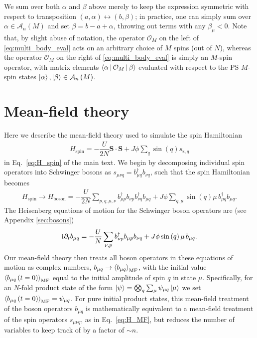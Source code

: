\documentclass[nofootinbib,twocolumn]{revtex4-2}
\renewcommand{\t}{\text} %
\newcommand{\f}[2]{\dfrac{#1}{#2}} %
\newcommand{\p}[1]{\left(#1\right)} %
\newcommand{\bk}{\Braket} %
\renewcommand{\v}{\bm} %
\renewcommand{\c}{\cdot} %
\renewcommand{\d}{\partial} %
\renewcommand{\i}{\mathrm{i}\mkern1mu} %
\newcommand{\1}{\mathds{1}}
\newcommand{\z}{\text{z}}
\newcommand{\A}{\mathcal{A}}
\renewcommand{\O}{\mathcal{O}}
\newcommand{\MF}{\text{MF}}
\begin{document}
We sum over both $\alpha$ and $\beta$ above merely to keep the expression symmetric with respect to transposition $\p{a,\alpha}\leftrightarrow\p{b,\beta}$; in practice, one can simply sum over $\alpha\in\A_n\p{M}$ and set $\beta=b-a+\alpha$, throwing out terms with any $\beta_\mu<0$.
Note that, by slight abuse of notation, the operator $\O_M$ on the left of \eqref{eq:multi_body_eval} acts on an arbitrary choice of $M$ spins (out of $N$), whereas the operator $\O_M$ on the right of \eqref{eq:multi_body_eval} is simply an $M$-spin operator, with matrix elements $\bk{\alpha|\O_M|\beta}$ evaluated with respect to the PS $M$-spin states $\ket\alpha,\ket\beta\in\A_n\p{M}$.

\section{Mean-field theory}
\label{sec:MFT}

Here we describe the mean-field theory used to simulate the spin Hamiltonian
\begin{align}
  H_{\t{spin}} = -\f{U}{2N}\v S\c\v S + J\phi \sum_q \sin\p{q} s_{\z,q}
\end{align}
in Eq.~\eqref{eq:H_spin} of the main text.
We begin by decomposing individual spin operators into Schwinger bosons as $s_{\mu\nu q} = b_{\mu q}^\dag b_{\nu q}$, such that the spin Hamiltonian becomes
\begin{align}
  H_{\t{spin}} \to H_{\t{boson}}
  = -\f{U}{2N} \sum_{p,q,\mu,\nu}
  b_{\mu p}^\dag b_{\nu p} b_{\nu q}^\dag b_{\mu q}
  + J\phi \sum_{q,\mu} \sin\p{q} \mu\, b_{\mu q}^\dag b_{\mu q}.
\end{align}
The Heisenberg equations of motion for the Schwinger boson operators are (see Appendix \ref{sec:bosons})
\begin{align}
  \i \d_t b_{\mu q}
  = -\f{U}{N} \sum_{\nu,p} b_{\nu p}^\dag b_{\mu p} b_{\nu q}
  + J\phi \sin\p{q} \mu\, b_{\mu q}.
\end{align}
Our mean-field theory then treats all boson operators in these equations of motion as complex numbers, $b_{\mu q}\to\bk{b_{\mu q}}_\MF$, with the initial value $\bk{b_{\mu q}\p{t=0}}_\MF$ equal to the initial amplitude of spin $q$ in state $\mu$.
Specifically, for an $N$-fold product state of the form $\ket\psi=\bigotimes_q\sum_\mu\psi_{\mu q}\ket{\mu}$ we set $\bk{b_{\mu q}\p{t=0}}_\MF = \psi_{\mu q}$.
For pure initial product states, this mean-field treatment of the boson operators $b_{\mu q}$ is mathematically equivalent to a mean-field treatment of the spin operators $s_{\mu\nu q}$, as in Eq.~\eqref{eq:H_MF}, but reduces the number of variables to keep track of by a factor of $\sim n$.
\end{document}
